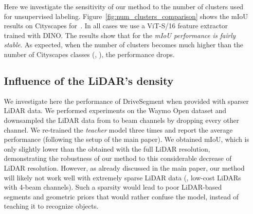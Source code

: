 \documentclass[runningheads]{llncs}
\newcommand{\ours}{DriveSegment\xspace}
\begin{document}
Here we investigate the sensitivity of our method to the number  of clusters used for unsupervised labeling.
Figure~\ref{fig:num_clusters_comparison} shows the mIoU results on Cityscapes for~. 
In all cases we use a ViT-S/16 feature extractor trained with DINO.
The results show that for  the \emph{mIoU performance is fairly stable}.
As expected, when the number of clusters becomes much higher than the number of Cityscapes classes (\eg, ), the performance drops.

\subsection{Influence of the LiDAR's density}
\label{sec:lidar_density_ablation}
We investigate here the performance of \ours when provided with sparser LiDAR data. We performed experiments on the Waymo Open dataset and downsampled the LiDAR data from  to  beam channels by dropping every other channel. We re-trained the \emph{teacher} model three times and report the average performance (following the setup of the main paper). 
We obtained  mIoU, which is only slightly lower than the  obtained with the full LiDAR resolution, demonstrating the robustness of our method to this considerable decrease of LiDAR resolution.
However, as already discussed in the main paper, our method will likely not work well with extremely sparse LiDAR data (\eg, low-cost LiDARs with 4-beam channels). 
Such a sparsity would lead to poor LiDAR-based segments and geometric priors that would rather confuse the model, instead of teaching it to recognize objects.
\end{document}

